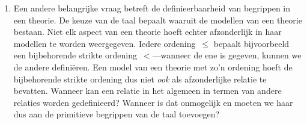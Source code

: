 \documentclass[openany]{memoir}
\begin{document}
\begin{explain}
\begin{enumerate}
  is van de overige axioma's van de meetkunde.
\item Een andere belangrijke vraag betreft de definieerbaarheid van
  begrippen in een theorie. De keuze van de taal bepaalt waaruit de
  modellen van een theorie bestaan. Niet elk aspect van een theorie
  hoeft echter afzonderlijk in haar modellen te worden weergegeven.
  Iedere ordening~$\le$ bepaalt bijvoorbeeld een bijbehorende strikte
  ordening~$<$---wanneer de ene is gegeven, kunnen we de andere
  definiëren. Een model van een theorie met zo'n ordening hoeft de
  bijbehorende strikte ordening dus niet \emph{ook} als afzonderlijke
  relatie te bevatten. Wanneer kan een relatie in het algemeen in
  termen van andere relaties worden gedefinieerd? Wanneer is dat
  onmogelijk en moeten we haar dus aan de primitieve begrippen van de
  taal toevoegen?
\end{enumerate}
\end{explain}
\endgroup

\begingroup
\def\olfilename{OLP-0169}
\def\olfilepath{content/first-order-logic/models-theories/}
\hypertarget{unit-OLP-0169}{}




\end{document}
